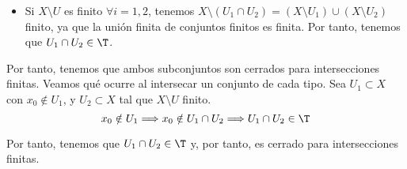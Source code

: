 \begin{ejercicio}
\begin{enumerate}
\begin{itemize}
            \item Si $X\setminus U$ es finito $\forall i=1,2$, tenemos $X\setminus (U_1\cap U_2)=(X\setminus U_1)\cup (X\setminus U_2)$ finito, ya que la unión finita de conjuntos finitos es finita. Por tanto, tenemos que $U_1\cap U_2\in \T$.
        \end{itemize}
        
        Por tanto, tenemos que ambos subconjuntos son cerrados para intersecciones finitas. Veamos qué ocurre al intersecar un conjunto de cada tipo. Sea $U_1\subset X$ con $x_0\notin U_1$, y $U_2\subset X$ tal que $X\setminus U$ finito.
        \begin{equation*}
            x_0\notin U_1\Longrightarrow x_0\notin U_1\cap U_2 \Longrightarrow U_1\cap U_2\in \T
        \end{equation*}

        Por tanto, tenemos que $U_1\cap U_2\in \T$ y, por tanto, es cerrado para intersecciones finitas.
    \end{enumerate}
\end{ejercicio}

